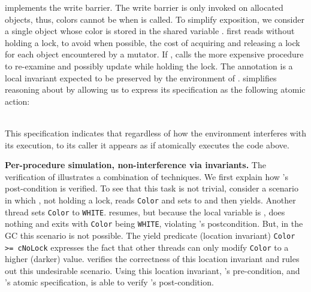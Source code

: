  implements the write barrier.
The write barrier is only invoked on allocated objects, thus, colors cannot be  when  is called.
To simplify exposition, we consider a single object whose color is stored in the shared variable . 
 first reads  without holding a lock, to avoid when possible, the cost of acquiring and releasing a lock for each object encountered by a mutator. 
If ,  calls the more expensive procedure  to re-examine and possibly update  while holding the lock. 
The annotation   is a local invariant expected to be preserved by the environment of . 
\civl simplifies reasoning about  by allowing us to express its specification as the following atomic action:\\
\begin{footnotesize}
\begin{tt}
[if (Color <= WHITE)  Color := GRAY]
\end{tt}
\end{footnotesize}\\
This specification indicates that regardless of how the environment interferes with its execution, to its caller it appears as if  atomically executes the code above. 

{\bf Per-procedure simulation, non-interference via invariants.}
The verification of  illustrates a combination of techniques. 
We first explain how 's post-condition is verified. 
To see that this task is not trivial, consider a scenario in which , not holding a lock, reads {\tt Color} and sets  to  and then yields. 
Another thread sets {\tt Color} to {\tt WHITE}. 
 resumes, but because the local variable  is , does nothing and exits with {\tt Color} being {\tt WHITE}, violating 's postcondition. 
But, in the GC this scenario is not possible. 
The yield predicate (location invariant) {\tt Color >= cNoLock} expresses the fact that other threads can only modify {\tt Color} to a higher (darker) value. 
\civl verifies the correctness of this location invariant and rules out this undesirable scenario. 
Using this location invariant, 's pre-condition, and 's atomic specification, \civl is able to verify 's post-condition. 

